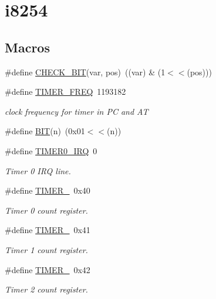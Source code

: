\hypertarget{group__i8254}{}\section{i8254}
\label{group__i8254}
\subsection*{Macros}
\begin{DoxyCompactItemize}
\item 
\#define \hyperlink{group__i8254_ga8d842ab28d8f573d16da7b28b36e2460}{C\+H\+E\+C\+K\+\_\+\+B\+I\+T}(var,  pos)~((var) \& (1$<$$<$(pos)))
\item 
\#define \hyperlink{group__i8254_gacf926951944b6cf370b7229ebd50dd8b}{T\+I\+M\+E\+R\+\_\+\+F\+R\+E\+Q}~1193182
\begin{DoxyCompactList}\small\item\em clock frequency for timer in P\+C and A\+T \end{DoxyCompactList}\item 
\#define \hyperlink{group__i8254_ga3a8ea58898cb58fc96013383d39f482c}{B\+I\+T}(n)~(0x01$<$$<$(n))
\item 
\#define \hyperlink{group__i8254_ga30bf84c312af248cb81bb224e09f9ba8}{T\+I\+M\+E\+R0\+\_\+\+I\+R\+Q}~0
\begin{DoxyCompactList}\small\item\em Timer 0 I\+R\+Q line. \end{DoxyCompactList}\item 
\#define \hyperlink{group__i8254_gacc9ff9df4a9674a1ce9ba08fc4a4679e}{T\+I\+M\+E\+R\+\_}~0x40
\begin{DoxyCompactList}\small\item\em Timer 0 count register. \end{DoxyCompactList}\item 
\#define \hyperlink{group__i8254_gac62c99c2a9289891c1b83052242cca49}{T\+I\+M\+E\+R\+\_}~0x41
\begin{DoxyCompactList}\small\item\em Timer 1 count register. \end{DoxyCompactList}\item 
\#define \hyperlink{group__i8254_ga1f34f18ad0ab8cace46b615773b48735}{T\+I\+M\+E\+R\+\_}~0x42
\begin{DoxyCompactList}\small\item\em Timer 2 count register. \end{DoxyCompactList}\item 

\end{DoxyCompactItemize}
